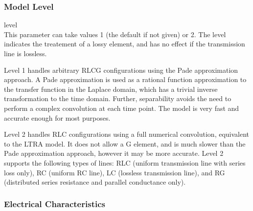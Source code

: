 \subsubsection{Model Level}

\begin{description}
\item{\vt level}\\
This parameter can take values 1 (the default if not given) or 2.  The
level indicates the treatement of a lossy element, and has no effect
if the transmission line is lossless.

Level 1 handles arbitrary RLCG configurations using the Pade
approximation approach.  A Pade approximation is used as a rational
function approximation to the transfer function in the Laplace domain,
which has a trivial inverse transformation to the time domain. 
Further, separability avoids the need to perform a complex convolution
at each time point.  The model is very fast and accurate enough for
most purposes.

Level 2 handles RLC configurations using a full numerical convolution,
equivalent to the LTRA model.  It does not allow a G element, and is
much slower than the Pade approximation approach, however it may be
more accurate.  Level 2 supports the following types of lines:  RLC
(uniform transmission line with series loss only), RC (uniform RC
line), LC (lossless transmission line), and RG (distributed series
resistance and parallel conductance only).
\end{description}

\subsubsection{Electrical Characteristics}

